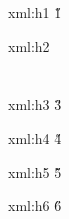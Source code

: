 
\startxmlsetups xml:h1
	\H1{\xmlflush{#1}}
\stopxmlsetups

\startxmlsetups xml:h2
	\section{} %
\stopxmlsetups

\startxmlsetups xml:h3
	\H3{}
\stopxmlsetups

\startxmlsetups xml:h4
	\H4{}
\stopxmlsetups

\startxmlsetups xml:h5
	\H5{}
\stopxmlsetups

\startxmlsetups xml:h6
	\H6{}
\stopxmlsetups

